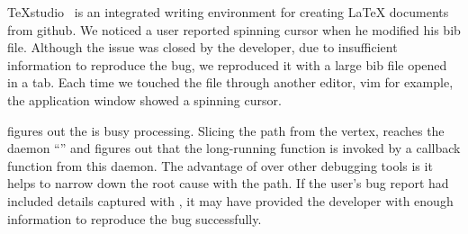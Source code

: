 TeXstudio~\cite{texstudio} is an integrated writing environment for creating
LaTeX documents from github. We noticed a user reported spinning cursor when he
modified his bib file. Although the issue was closed by the developer, due to insufficient
information to reproduce the bug, we reproduced it with a large bib file opened in
a tab. Each time we touched the file through another editor, vim for example, the
application window showed a spinning cursor.

\xxx figures out the \spinningnode is busy processing. Slicing the path from
the vertex, \xxx reaches the daemon ``'' and figures out that the long-running function
is invoked by a callback function from this daemon. The advantage of
\xxx over other debugging tools is it helps to narrow down the root cause with
the path. If the user's bug report had included details captured with \xxx, it may have provided
the developer with enough information to reproduce the bug successfully.

